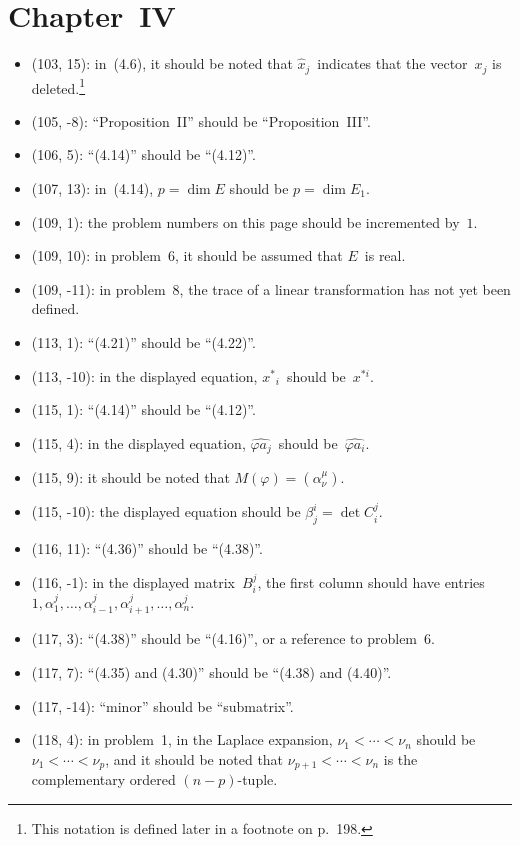 \documentclass[letterpaper,12pt]{article}
\begin{document}
\section*{Chapter~IV}
\begin{itemize}
\item (103, 15): in~(4.6), it should be noted that \(\hat{x}_j\)~indicates that the vector~\(x_j\) is deleted.\footnote{This notation is defined later in a footnote on p.~198.}
\item (105, -8): ``Proposition~II'' should be ``Proposition~III''.
\item (106, 5): ``(4.14)'' should be ``(4.12)''.
\item (107, 13): in~(4.14), \(p=\dim E\) should be \(p=\dim E_1\).
\item (109, 1): the problem numbers on this page should be incremented by~\(1\).
\item (109, 10): in problem~6, it should be assumed that \(E\)~is real.
\item (109, -11): in problem~8, the trace of a linear transformation has not yet been defined.
\item (113, 1): ``(4.21)'' should be ``(4.22)''.
\item (113, -10): in the displayed equation, \({x^*}_i\)~should be~\(x^{*i}\).
\item (115, 1): ``(4.14)'' should be ``(4.12)''.
\item (115, 4): in the displayed equation, \(\widehat{\varphi a_j}\)~should be~\(\widehat{\varphi a_i}\).
\item (115, 9): it should be noted that \(M(\varphi)=(\alpha^{\mu}_{\nu})\).
\item (115, -10): the displayed equation should be \(\beta^i_j=\det C^j_i\).
\item (116, 11): ``(4.36)'' should be ``(4.38)''.
\item (116, -1): in the displayed matrix~\(B^j_i\), the first column should have entries \(1,\alpha^j_1,\ldots,\alpha^j_{i-1},\alpha^j_{i+1},\ldots,\alpha^j_n\).
\item (117, 3): ``(4.38)'' should be ``(4.16)'', or a reference to problem~6.
\item (117, 7): ``(4.35) and (4.30)'' should be ``(4.38) and (4.40)''.
\item (117, -14): ``minor'' should be ``submatrix''.
\item (118, 4): in problem~1, in the Laplace expansion, \(\nu_1<\cdots<\nu_n\) should be \(\nu_1<\cdots<\nu_p\), and it should be noted that \(\nu_{p+1}<\cdots<\nu_n\) is the complementary ordered \((n-p)\)-tuple.

\end{itemize}
\end{document}
